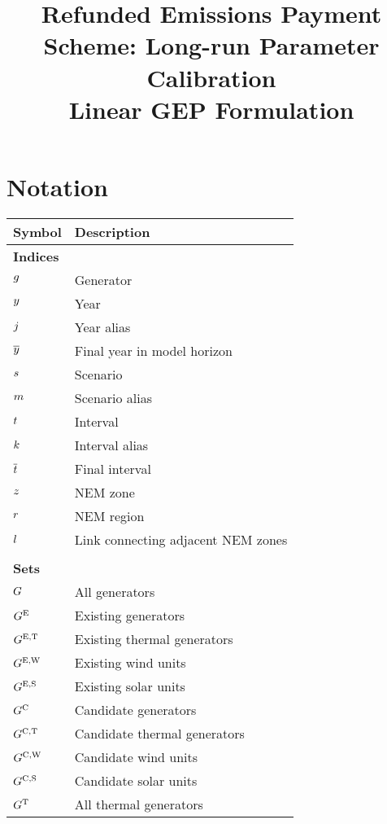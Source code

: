 \documentclass{article}
\title{Refunded Emissions Payment Scheme: Long-run Parameter Calibration\\Linear GEP Formulation}
\begin{document}
	\maketitle
	
	\section{Notation}
	\renewcommand*{\arraystretch}{1.3}
	\begin{longtable}{ p{}  p{}}
		\textbf{Symbol} & \textbf{Description}\\
		\hline\hline
		\multicolumn{2}{l}{\textbf{Indices}}\\
		$g$ & Generator\\ 
		$y$ & Year\\
		$j$ & Year alias\\
		$\overline{y}$ & Final year in model horizon\\
		$s$ & Scenario\\
		$m$ & Scenario alias\\
		$t$ & Interval\\
		$k$ & Interval alias\\
		$\overline{t}$ & Final interval\\
		$z$ & NEM zone\\
		$r$ & NEM region\\
		$l$ & Link connecting adjacent NEM zones\\
		& \\
		\multicolumn{2}{l}{\textbf{Sets}}\\
		$G$ & All generators\\
		$G^{\mathrm{E}}$ & Existing generators\\
		$G^{\mathrm{E,T}}$ & Existing thermal generators\\
		$G^{\mathrm{E,W}}$ & Existing wind units\\
		$G^{\mathrm{E,S}}$ & Existing solar units\\
		$G^{\mathrm{C}}$ & Candidate generators\\
		$G^{\mathrm{C,T}}$ & Candidate thermal generators\\
		$G^{\mathrm{C,W}}$ & Candidate wind units\\
		$G^{\mathrm{C,S}}$ & Candidate solar units\\
		$G^{\mathrm{T}}$ & All thermal generators\\

\end{longtable}
\end{document}
